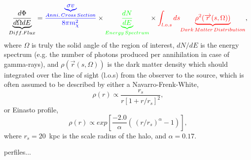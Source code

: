 \begin{equation}
\underbrace{\frac{d\Phi}{d\Omega dE}}_{Diff. Flux} = {\color{blue} \frac{ \underbrace{ \sigma v }_{Anni.\, Cross\, Section}}{8\pi m_{\chi}^2}} \times {\color{green} \underbrace{\frac{dN}{dE}}_{Energy\, Spectrum}} \times {\color{red} \int_{l.o.s} ds} {\color{red}  \underbrace{\rho^2 (\overrightarrow{r}(s,\Omega))}_{Dark\, Matter\, Distribution}},
\label{eq:flux}
\end{equation}where $\Omega$ is truly the solid angle of the region of interest, $dN/dE$ is the energy spectrum (e.g. the number of photons produced per annihilation in case of gamma-rays), and $\rho (\overrightarrow{r}(s,\Omega))$ is the dark matter density which should integrated over the line of sight (l.o.s) from the observer to the source, which is often assumed to be described by either a Navarro-Frenk-White,
\begin{equation}
\rho(r) \propto \frac{r_s}{r[1+ r/r_s]^2},
\end{equation}or Einasto profile,
\begin{equation}
\rho(r) \propto exp \left[ \frac{-2.0}{\alpha} \left(\,  (r/r_s)^{\alpha}-1 \right) \right],
\end{equation}where $r_s=20$~kpc is the scale radius of the halo, and $\alpha=0.17$.



perfiles...